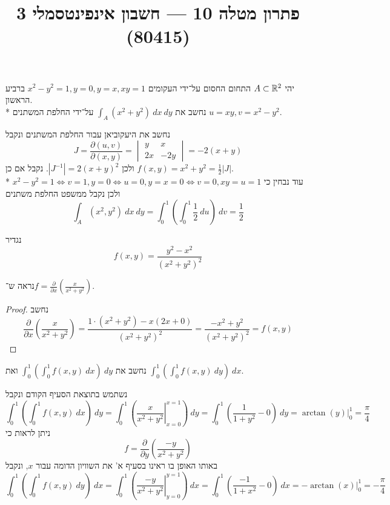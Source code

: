 
\title{פתרון מטלה 10 --- חשבון אינפינטסמלי 3 (80415)}


\maketitle
\maketitleprint{}

\Question{}
יהי $A \subset \mathbb{R}^2$ התחום החסום על־ידי העקומים $x^2 - y^2 = 1, y = 0, y = x, xy = 1$ ברביע הראשון. \\*
נחשב את $\int_A (x^2 + y^2)\ dx\ dy$ על־ידי החלפת המשתנים $u = xy, v = x^2 - y^2$.

נחשב את היעקוביאן עבור החלפת המשתנים ונקבל
\[
	J = \frac{\partial(u, v)}{\partial(x, y)}
	= \begin{vmatrix}
		y & x \\
		2x & -2y
	\end{vmatrix}
	= -2(x + y)
\]
ולכן $|J^{-1}| = 2{(x + y)}^2$.
נקבל אם כן $f(x, y) = x^2 + y^2 = \frac{1}{2} |J|$. \\*
עוד נבחין כי $x^2 - y^2 = 1 \iff v = 1, y = 0 \iff u = 0, y = x = 0 \iff v = 0, xy = u = 1$ ולכן נקבל ממשפט החלפת משתנים
\[
	\int_A (x^2, y^2)\ dx\ dy
	= \int_0^1 \left( \int_0^1 \frac{1}{2}\ du \right)\ dv
	= \frac{1}{2}
\]

\Question{}
נגדיר
\[
	f(x, y) = \frac{y^2 - x^2}{{(x^2 + y^2)}^2}
\]

\Subquestion{}
נראה ש־$f = \frac{\partial}{\partial x}( \frac{x}{x^2 + y^2})$.
\begin{proof}
	נחשב
	\[
		\frac{\partial}{\partial x}( \frac{x}{x^2 + y^2})
		= \frac{1 \cdot (x^2 + y^2) - x (2x + 0)}{{(x^2 + y^2)}^2}
		= \frac{-x^2 + y^2}{{(x^2 + y^2)}^2}
		= f(x, y)
	\]
\end{proof}

\Subquestion{}
נחשב את $\int_0^1( \int_0^1 f(x, y)\ dx)\ dy$ ואת $\int_0^1( \int_0^1 f(x, y)\ dy)\ dx$.

נשתמש בתוצאת הסעיף הקודם ונקבל
\[
	\int_0^1 \left( \int_0^1 f(x, y)\ dx\right)\ dy
	= \int_0^1 \left( \left. \frac{x}{x^2 + y^2} \right|_{x = 0}^{x = 1} \right)\ dy
	= \int_0^1 \left( \frac{1}{1 + y^2} - 0 \right)\ dy
	= \arctan(y) \big|_0^1
	= \frac{\pi}{4}
\]
ניתן לראות כי
\[
	f = \frac{\partial}{\partial y}( \frac{-y}{x^2 + y^2})
\]
באותו האופן בו ראינו בסעיף א' את השוויון הדומה עבור $x$, ונקבל
\[
	\int_0^1 \left( \int_0^1 f(x, y)\ dy\right)\ dx
	= \int_0^1 \left( \left. \frac{-y}{x^2 + y^2} \right|_{y = 0}^{y = 1} \right)\ dx
	= \int_0^1 \left( \frac{-1}{1 + x^2} - 0 \right)\ dx
	= -\arctan(x) \big|_0^1
	= -\frac{\pi}{4}
\]

